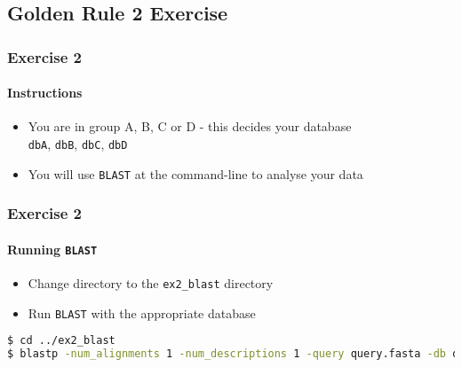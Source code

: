 %

\subsection{Golden Rule 2 Exercise}
\begin{frame}
  \frametitle{Exercise 2}
  \framesubtitle{Instructions}    
  \begin{itemize}
    \item You are in group A, B, C or D - this decides your database\\
    \texttt{dbA}, \texttt{dbB}, \texttt{dbC}, \texttt{dbD}
    \item You will use \texttt{BLAST} at the command-line to analyse your data
  \end{itemize}
\end{frame}

\begin{frame}[fragile]
  \frametitle{Exercise 2}
  \framesubtitle{Running \texttt{BLAST}}
  \begin{itemize}
    \item Change directory to the \texttt{ex2\_blast} directory
    \item Run \texttt{BLAST} with the appropriate database
  \end{itemize}
\begin{lstlisting}[language=bash]
$ cd ../ex2_blast
$ blastp -num_alignments 1 -num_descriptions 1 -query query.fasta -db dbA
\end{lstlisting}    
\end{frame}

